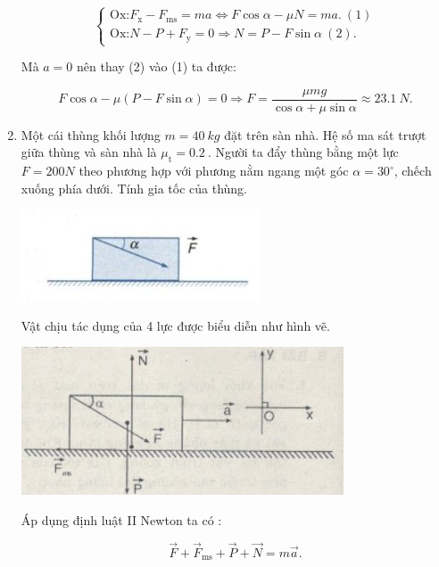 \begin{enumerate}[label=\bfseries Bài \arabic*:]
{		$$\begin{cases}
			\text{Ox:} F_\text{x} - F_\text{ms} = ma \Leftrightarrow F\cos \alpha - \mu N = ma.\ (1) \\
			\text{Ox:}  N - P + F_\text{y}= 0 \Rightarrow N =P - F\sin \alpha\ (2).
			
		\end{cases}$$
		
		Mà $a = 0$ nên thay (2) vào (1) ta được:
		
		$$F\cos \alpha - \mu(P - F\sin \alpha) = 0 \Rightarrow F = \dfrac{\mu mg}{\cos \alpha + \mu \sin \alpha} \approx \SI{23,1}{N}.$$
		
		
	}

	\item {}
	
	
	{
		Một cái thùng khối lượng $m = \SI{40}{kg}$ đặt trên sàn nhà. Hệ số ma sát trượt giữa thùng và sàn nhà là $\mu_\text{t} = \SI{0,2}{}$. Người ta đẩy thùng bằng một lực $F =200N$ theo phương hợp với phương nằm ngang một góc $\alpha = 30^\circ$, chếch xuống phía dưới. Tính gia tốc của thùng. 
		
		\begin{center}
			\includegraphics[scale=1]{../figs/VN10-2022-PH-TP021-17.jpg}
		\end{center}
	}
	
	\hideall
	{
		Vật chịu tác dụng của 4 lực được biểu diễn như hình vẽ.
		
		\begin{center}
			\includegraphics[scale=1]{../figs/VN10-2022-PH-TP021-18.jpg}
		\end{center}
		
		Áp dụng định luật II Newton ta có :
		
		$$\vec F + \vec F_\text{ms} + \vec P + \vec N = m\vec a.$$
		
}
\end{enumerate}
